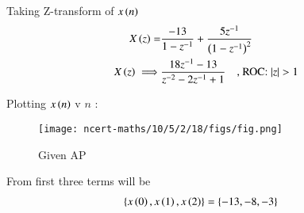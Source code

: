 \documentclass[journal,12pt,twocolumn]{IEEEtran}
\begin{document}
Taking Z-transform of $x\left(n\right)$
\begin{align}
X\left(z\right) = & \frac{-13}{1 - z^{-1}} + \frac{ 5z^{-1}}{\left(1 - z^{-1}\right)^2}\\
X\left(z\right)\implies & \frac{18z^{-1} - 13}{z^{-2} - 2z^{-1} + 1} \quad \text{, ROC: } |z| > 1 
\end{align}

\pagebreak

Plotting $x\left(n\right)$ v $n$ :
\begin{figure}[h]
    \texttt{[image: ncert-maths/10/5/2/18/figs/fig.png]}
    \caption{Given AP}
    \label{fig:10.5.2.18.1}
\end{figure}

From  first three terms will be
\begin{align}
\{x\left(0\right),x\left(1\right),x\left(2\right)\} &= \{-13 , -8 , -3\}
\end{align}















\end{document}

